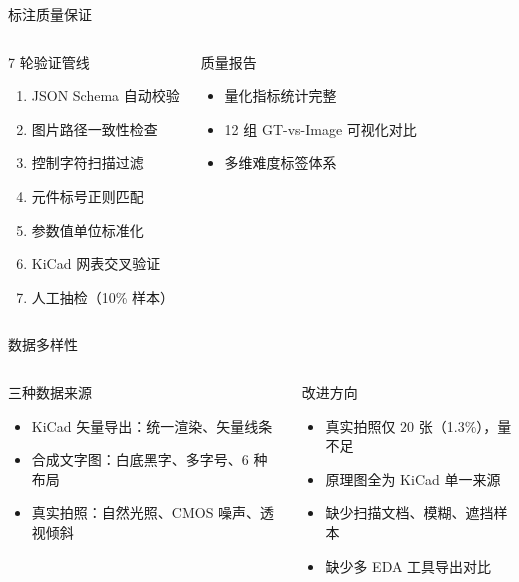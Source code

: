 \documentclass[10pt,aspectratio=169,table]{beamer}
\begin{document}
\begin{frame}{标注质量保证}
  \begin{columns}[T]
      \begin{block}{7 轮验证管线}
        \footnotesize
        \begin{enumerate}
          \item JSON Schema 自动校验
          \item 图片路径一致性检查
          \item 控制字符扫描过滤
          \item 元件标号正则匹配
          \item 参数值单位标准化
          \item KiCad 网表交叉验证
          \item 人工抽检（10\% 样本）
        \end{enumerate}
      \end{block}
      \begin{block}{质量报告}
        \footnotesize
        \begin{itemize}
          \item 量化指标统计完整
          \item 12 组 GT-vs-Image 可视化对比
          \item 多维难度标签体系
        \end{itemize}
      \end{block}
  \end{columns}
\end{frame}

\begin{frame}{数据多样性}
  \begin{columns}[T]
      \begin{block}{三种数据来源}
        \footnotesize
        \begin{itemize}
          \item KiCad 矢量导出：统一渲染、矢量线条
          \item 合成文字图：白底黑字、多字号、6 种布局
          \item 真实拍照：自然光照、CMOS 噪声、透视倾斜
        \end{itemize}
      \end{block}
      \begin{block}{改进方向}
        \footnotesize
        \begin{itemize}
          \item 真实拍照仅 20 张（1.3\%），量不足
          \item 原理图全为 KiCad 单一来源
          \item 缺少扫描文档、模糊、遮挡样本
          \item 缺少多 EDA 工具导出对比
        \end{itemize}
      \end{block}
  \end{columns}
\end{frame}
\end{document}
